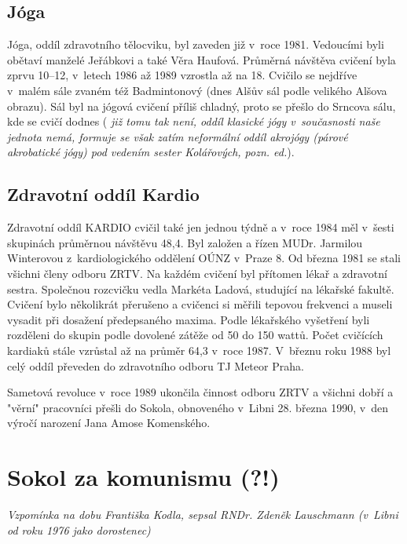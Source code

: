 \documentclass[a5paper, 11pt, twoside]{article}
\newcommand{\pozned}[1]{%
\textit{#1}}
\begin{document}
\subsection{Jóga}

Jóga, oddíl zdravotního tělocviku, byl zaveden již v~roce 1981.
Vedoucími byli obětaví manželé Jeřábkovi a také Věra Haufová. Průměrná
návštěva cvičení byla zprvu 10--12, v~letech 1986 až 1989 vzrostla až na
18. Cvičilo se nejdříve v~malém sále zvaném též Badmintonový (dnes Alšův
sál podle velikého Alšova obrazu). Sál byl na jógová cvičení příliš
chladný, proto se přešlo do Srncova sálu, kde se cvičí dodnes (\pozned{již
tomu tak není, oddíl klasické jógy v~současnosti naše jednota nemá,
formuje se však zatím neformální oddíl akrojógy (párové akrobatické
jógy) pod vedením sester Kolářových, pozn. ed.}).

\subsection{Zdravotní oddíl Kardio}

Zdravotní oddíl KARDIO cvičil také jen jednou týdně a v~roce 1984 měl
v~šesti skupinách průměrnou návštěvu 48,4. Byl založen a řízen MUDr.
Jarmilou Winterovou z~kardiologického oddělení OÚNZ v~Praze 8. Od března
1981 se stali všichni členy odboru ZRTV. Na každém cvičení byl přítomen
lékař a zdravotní sestra. Společnou rozcvičku vedla Markéta Ladová,
studující na lékařské fakultě. Cvičení bylo několikrát přerušeno a
cvičenci si měřili tepovou frekvenci a museli vysadit při dosažení
předepsaného maxima. Podle lékařského vyšetření byli rozděleni do skupin
podle dovolené zátěže od 50 do 150 wattů. Počet cvičících kardiaků stále
vzrůstal až na průměr 64,3 v~roce 1987. V~březnu roku 1988 byl celý
oddíl převeden do zdravotního odboru TJ Meteor Praha.

Sametová revoluce v~roce 1989 ukončila činnost odboru ZRTV a všichni
dobří a "věrní" pracovníci přešli do Sokola, obnoveného v~Libni 28.
března 1990, v~den výročí narození Jana Amose Komenského.

\section{Sokol za komunismu (?!)}

\begin{center}
\textit{Vzpomínka na dobu Františka Kodla, sepsal RNDr. Zdeněk Lauschmann (v~Libni od roku 1976 jako dorostenec)}
\end{center}
\end{document}
